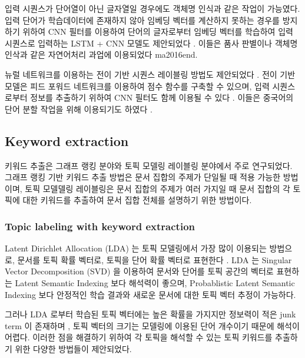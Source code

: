 \documentclass[11pt]{article}
\begin{document}
입력 시퀀스가 단어열이 아닌 글자열일 경우에도 객체명 인식과 같은 작업이 가능였다\citep{gridach2017character}.
입력 단어가 학습데이터에 존재하지 않아 임베딩 벡터를 계산하지 못하는 경우를 방지하기 위하여 CNN 필터를 이용하여 단어의 글자로부터 임베딩 벡터를 학습하여 입력 시퀀스로 입력하는 LSTM + CNN 모델도 제안되었다 \citep{chiu2016named}.
이들은 품사 판별이나 객체명 인삭과 같은 자연어처리 과업에 이용되었다 {ma2016end}.

뉴럴 네트워크를 이용하는 전이 기반 시퀀스 레이블링 방법도 제안되었다 \citep{zheng2013deep, collobert2011natural, alberti2015improved}.
전이 기반 모델은 피드 포워드 네트워크를 이용하여 점수 함수를 구축할 수 있으며, 입력 시퀀스로부터 정보를 추출하기 위하여 CNN 필터도 함께 이용될 수 있다 \citep{collobert2011natural}.
이들은 중국어의 단어 분할 작업을 위해 이용되기도 하였다 \citep{zhang2016transition, cai2017fast, ballesteros2015improved}.


\subsection{Keyword extraction}

키워드 추출은 그래프 랭킹 분야와 토픽 모델링 레이블링 분야에서 주로 연구되었다.
그래프 랭킹 기반 키워드 추출 방법은 문서 집합의 주제가 단일될 때 적용 가능한 방법이며, 토픽 모델델링 레이블링은 문서 집합의 주제가 여러 가지일 때 문서 집합의 각 토픽에 대한 키워드를 추출하여 문서 집합 전체를 설명하기 위한 방법이다.

\subsubsection{Topic labeling with keyword extraction}

Latent Dirichlet Allocation (LDA) 는 토픽 모델링에서 가장 많이 이용되는 방법으로, 문서를 토픽 확률 벡터로, 토픽을 단어 확률 벡터로 표현한다 \citep{blei2003latent}.
LDA 는 Singular Vector Decomposition (SVD) 을 이용하여 문서와 단어를 토픽 공간의 벡터로 표현하는 Latent Semantic Indexing \citep{landauer1998introduction} 보다 해석력이 좋으며, Probablistic Latent Semantic Indexing \citep{hofmann1999probabilistic} 보다 안정적인 학습 결과와 새로운 문서에 대한 토픽 벡터 추정이 가능하다.

그러나 LDA 로부터 학습된 토픽 벡터에는 높은 확률을 가지지만 정보력이 적은 junk term 이 존재하며 \citep{newman2010evaluating}, 토픽 벡터의 크기는 모델링에 이용된 단어 개수이기 때문에 해석이 어렵다.
이러한 점을 해결하기 위하여 각 토픽을 해석할 수 있는 토픽 키워드를 추출하기 위한 다양한 방법들이 제안되었다. 
\end{document}
